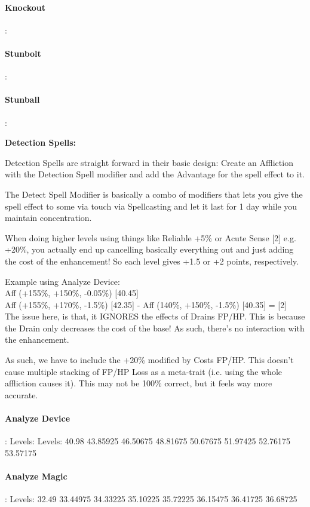 \begin{multicols*}{2}
	\paragraph{Knockout}:
	\paragraph{Stunbolt}:
	\paragraph{Stunball}:
	
	\textbf{Detection Spells:\\}
	
	Detection Spells are straight forward in their basic design: Create an Affliction with the Detection Spell modifier and add the Advantage for the spell effect to it.
	
	The Detect Spell Modifier is basically a combo of modifiers that lets you give the spell effect to some via touch via Spellcasting and let it last for 1 day while you maintain concentration.
	
	When doing higher levels using things like Reliable +5\% or Acute Sense [2] e.g. +20\%, you actually end up cancelling basically everything out and just adding the cost of the enhancement! So each level gives +1.5 or +2 points, respectively.
	
	Example using Analyze Device:\\
	Aff (+155\%, +150\%, -0.05\%) [40.45]\\
	Aff (+155\%, +170\%, -1.5\%) [42.35] - Aff (140\%, +150\%, -1.5\%) [40.35] = [2]\\
	
	The issue here, is that, it IGNORES the effects of Drains FP/HP. This is because the Drain only decreases the cost of the base! As such, there's no interaction with the enhancement.
	
	As such, we have to include the +20\% modified by Costs FP/HP. This doesn't cause multiple stacking of FP/HP Loss as a meta-trait (i.e. using the whole affliction causes it). This may not be 100\% correct, but it feels way more accurate.
	
	\paragraph{Analyze Device}: Levels: Levels: 40.98 43.85925 46.50675 48.81675 50.67675 51.97425 52.76175 53.57175
	
	\paragraph{Analyze Magic}: Levels: 32.49 33.44975 34.33225 35.10225 35.72225 36.15475 36.41725 36.68725
	

\end{multicols*}
